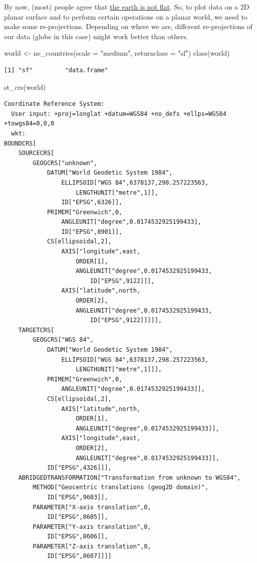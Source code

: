 \documentclass[
  letterpaper,
  DIV=11,
  numbers=noendperiod]{scrreprt}
\newenvironment{Shaded}{\begin{snugshade}}{\end{snugshade}}
\newcommand{\AttributeTok}[1]{\textcolor[rgb]{0.40,0.45,0.13}{#1}}
\newcommand{\FunctionTok}[1]{\textcolor[rgb]{0.28,0.35,0.67}{#1}}
\newcommand{\NormalTok}[1]{\textcolor[rgb]{0.00,0.23,0.31}{#1}}
\newcommand{\OtherTok}[1]{\textcolor[rgb]{0.00,0.23,0.31}{#1}}
\newcommand{\StringTok}[1]{\textcolor[rgb]{0.13,0.47,0.30}{#1}}
\begin{document}
By now, (most) people agree that
\href{https://r-spatial.org/r/2020/06/17/s2.html}{the earth is not
flat}. So, to plot data on a 2D planar surface and to perform certain
operations on a planar world, we need to make some re-projections.
Depending on where we are, different re-projections of our data (globe
in this case) might work better than others.

\begin{Shaded}
\begin{Highlighting}[]
\NormalTok{world }\OtherTok{\textless{}{-}} \FunctionTok{ne\_countries}\NormalTok{(}\AttributeTok{scale =} \StringTok{"medium"}\NormalTok{, }\AttributeTok{returnclass =} \StringTok{"sf"}\NormalTok{)}
\FunctionTok{class}\NormalTok{(world)}
\end{Highlighting}
\end{Shaded}

\begin{verbatim}
[1] "sf"         "data.frame"
\end{verbatim}

\begin{Shaded}
\begin{Highlighting}[]
\FunctionTok{st\_crs}\NormalTok{(world)}
\end{Highlighting}
\end{Shaded}

\begin{verbatim}
Coordinate Reference System:
  User input: +proj=longlat +datum=WGS84 +no_defs +ellps=WGS84 +towgs84=0,0,0 
  wkt:
BOUNDCRS[
    SOURCECRS[
        GEOGCRS["unknown",
            DATUM["World Geodetic System 1984",
                ELLIPSOID["WGS 84",6378137,298.257223563,
                    LENGTHUNIT["metre",1]],
                ID["EPSG",6326]],
            PRIMEM["Greenwich",0,
                ANGLEUNIT["degree",0.0174532925199433],
                ID["EPSG",8901]],
            CS[ellipsoidal,2],
                AXIS["longitude",east,
                    ORDER[1],
                    ANGLEUNIT["degree",0.0174532925199433,
                        ID["EPSG",9122]]],
                AXIS["latitude",north,
                    ORDER[2],
                    ANGLEUNIT["degree",0.0174532925199433,
                        ID["EPSG",9122]]]]],
    TARGETCRS[
        GEOGCRS["WGS 84",
            DATUM["World Geodetic System 1984",
                ELLIPSOID["WGS 84",6378137,298.257223563,
                    LENGTHUNIT["metre",1]]],
            PRIMEM["Greenwich",0,
                ANGLEUNIT["degree",0.0174532925199433]],
            CS[ellipsoidal,2],
                AXIS["latitude",north,
                    ORDER[1],
                    ANGLEUNIT["degree",0.0174532925199433]],
                AXIS["longitude",east,
                    ORDER[2],
                    ANGLEUNIT["degree",0.0174532925199433]],
            ID["EPSG",4326]]],
    ABRIDGEDTRANSFORMATION["Transformation from unknown to WGS84",
        METHOD["Geocentric translations (geog2D domain)",
            ID["EPSG",9603]],
        PARAMETER["X-axis translation",0,
            ID["EPSG",8605]],
        PARAMETER["Y-axis translation",0,
            ID["EPSG",8606]],
        PARAMETER["Z-axis translation",0,
            ID["EPSG",8607]]]]
\end{verbatim}
\end{document}
